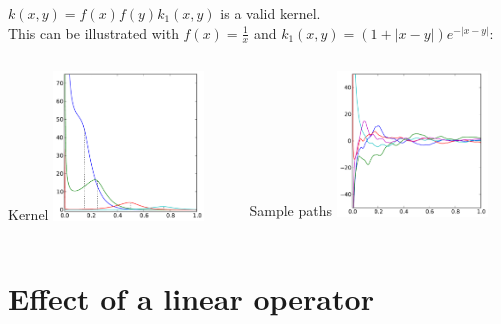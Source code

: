 \documentclass{beamer}
\begin{document}
\begin{frame}{}
\begin{example}
$k(x,y) = f(x)f(y)k_1(x,y)$ is a valid kernel.\\
\vspace{0.5cm}
This can be illustrated with $f(x) = \frac1x$ and $k_1(x,y) = (1 + |x-y|) e^{-|x-y|}$:\\ 
\begin{columns}[c]
\begin{column}{5cm}
\begin{center}
Kernel
\includegraphics[width=4cm]{figures/python/newfromold-prodfunc-k}
\end{center}
\end{column}
\begin{column}{5cm}
\begin{center}
Sample paths
\includegraphics[width=4cm]{figures/python/newfromold-prodfunc-traj}
\end{center}
\end{column}
\end{columns}
\end{example}
\end{frame}

\section[linear operator]{Effect of a linear operator}
\subsection{}
\end{document}
